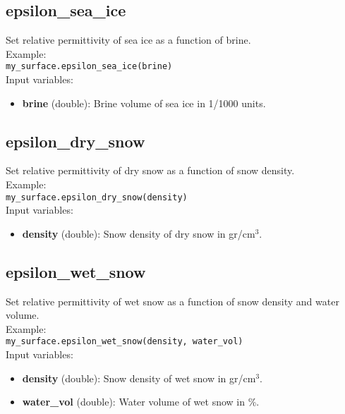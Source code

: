 \subsection{epsilon\_sea\_ice}

Set relative permittivity of sea ice as a function of brine.\\

Example:\\

\texttt{my\_surface.epsilon\_sea\_ice(brine)}\\

Input variables:
\begin{itemize}
\item {\bf brine} (double): Brine volume of sea ice in 1/1000 units.
\end{itemize}


\subsection{epsilon\_dry\_snow}

Set relative permittivity of dry snow as a function of snow density.\\

Example:\\

\texttt{my\_surface.epsilon\_dry\_snow(density)}\\

Input variables:
\begin{itemize}
\item {\bf density} (double): Snow density of dry snow in gr/cm$^3$.
\end{itemize}


\subsection{epsilon\_wet\_snow}

Set relative permittivity of wet snow as a function of snow density and water volume.\\

Example:\\

\texttt{my\_surface.epsilon\_wet\_snow(density, water\_vol)}\\

Input variables:
\begin{itemize}
\item {\bf density} (double): Snow density of wet snow in gr/cm$^3$.
\item {\bf water\_vol} (double): Water volume of wet snow in \%.
\end{itemize}


